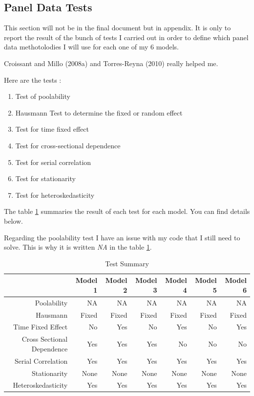 \documentclass[12pt,]{article}
\providecommand{\tightlist}{%
  \setlength{\itemsep}{0pt}\setlength{\parskip}{0pt}}
\begin{document}
\newpage

\subsection{Panel Data Tests}\label{panel-data-tests}

This section will not be in the final document but in appendix. It is
only to report the result of the bunch of tests I carried out in order
to define which panel data methotolodies I will use for each one of my 6
models.

Croissant and Millo (2008a) and Torres-Reyna (2010) really helped me.

Here are the tests :

\begin{enumerate}
\def\labelenumi{\arabic{enumi}.}
\tightlist
\item
  Test of poolability
\item
  Hausmann Test to determine the fixed or random effect
\item
  Test for time fixed effect
\item
  Test for cross-sectional dependence
\item
  Test for serial correlation
\item
  Test for stationarity
\item
  Test for heteroskedasticity
\end{enumerate}

The table \ref{TestSummary} summaries the result of each test for each
model. You can find details below.

Regarding the poolability test I have an issue with my code that I still
need to solve. This is why it is written \emph{NA} in the table
\ref{TestSummary}.

\begin{table}[h]
\centering
\begin{tabular}{rrrrrrr}
\hline
 & {Model 1} & {Model 2} & {Model 3} & {Model 4} & {Model 5} & {Model 6} \\ 
\hline
{Poolability} & NA & NA & NA & NA & NA & NA \\
{Hausmann} & Fixed & Fixed & Fixed & Fixed & Fixed & Fixed \\
{Time Fixed Effect} & No & Yes & No & Yes & No & Yes \\
{Cross Sectional Dependence} & Yes & Yes & Yes & No & No & No \\
{Serial Correlation} & Yes & Yes & Yes & Yes & Yes & Yes \\
{Stationarity} & None & None & None & None & None & None \\
{Heteroskedasticity} & Yes & Yes & Yes & Yes & Yes & Yes \\ 
\hline
\end{tabular}
\caption{Test Summary}
\label{TestSummary}
\end{table}
\end{document}
